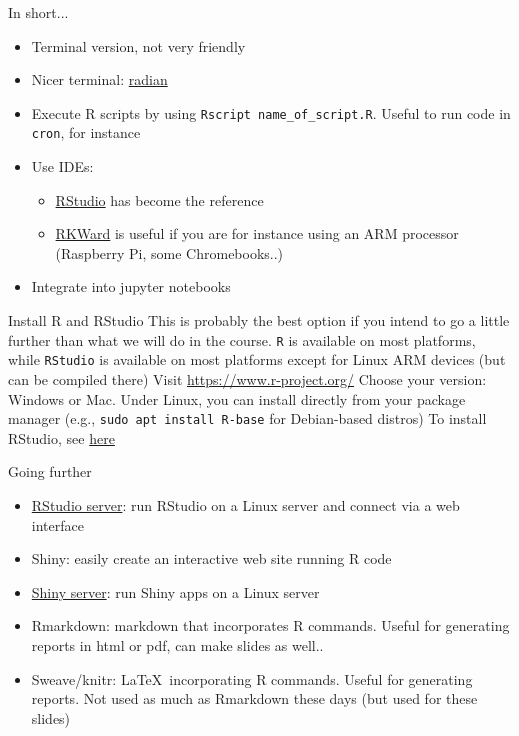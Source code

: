 \documentclass[aspectratio=169]{beamer}\usepackage[]{graphicx}\usepackage[]{xcolor}
\begin{document}
\begin{frame}{In short...}
\begin{itemize}
\item Terminal version, not very friendly
\vfill
\item Nicer terminal: \href{https://github.com/randy3k/radian}{radian}
\vfill
\item Execute R scripts by using \texttt{Rscript name\_of\_script.R}. Useful to run code in \texttt{cron}, for instance
\vfill
\item Use IDEs:
    \begin{itemize}
    \item \href{https://www.rstudio.com/products/rstudio/}{RStudio} has become the reference
    \item \href{https://invent.kde.org/education/rkward}{RKWard} is useful if you are for instance using an ARM processor (Raspberry Pi, some Chromebooks..)
    \end{itemize}
\vfill
\item Integrate into jupyter notebooks
\end{itemize}
\end{frame}

\begin{frame}{Install R and RStudio}
This is probably the best option if you intend to go a little further than what we will do in the course. \texttt{R} is available on most platforms, while \texttt{RStudio} is available on most platforms except for Linux ARM devices (but can be compiled there)
\vfill
Visit \href{https://www.r-project.org/}{https://www.r-project.org/}
\vfill
Choose your version: Windows or Mac. Under Linux, you can install directly from your package manager (e.g., \texttt{sudo apt install R-base} for Debian-based distros)
\vfill
To install RStudio, see \href{https://www.rstudio.com/products/rstudio/}{here}
\end{frame}

\begin{frame}{Going further}
\begin{itemize}
\item \href{https://www.rstudio.com/products/rstudio/\#rstudio-server}{RStudio server}: run RStudio on a Linux server and connect via a web interface
\vfill
\item Shiny: easily create an interactive web site running R code
\vfill
\item \href{https://www.rstudio.com/products/shiny/shiny-server/}{Shiny server}: run Shiny apps on a Linux server
\vfill
\item Rmarkdown: markdown that incorporates R commands. Useful for generating reports in html or pdf, can make slides as well..
\vfill
\item Sweave/knitr: \LaTeX\ incorporating R commands. Useful for generating reports. Not used as much as Rmarkdown these days (but used for these slides)
\end{itemize}
\end{frame}
\end{document}

